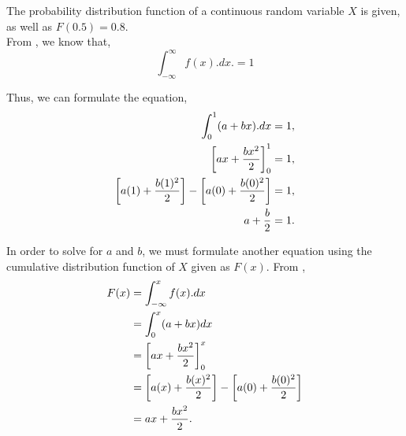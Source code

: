 %
%

\begin{subquestions}
	
\subquestion

\begin{subsubquestions}
	
\subsubquestion
The probability distribution function of a continuous random variable $X$ is given, as well as $F(0.5)=0.8.$ \\

From , we know that,
\begin{equation}
	 \int_{-\infty}^{\infty} f(x).dx. = 1
\end{equation}


Thus, we can formulate the equation,
\begin{align}
	\int_{0}^{1} (a+bx).dx = 1, \nonumber \\
	\left[ax + \frac{bx^2}{2}\right]_0^1 = 1, \nonumber \\
	\left[a(1) + \frac{b(1)^2}{2}\right] - \left[a(0) + \frac{b(0)^2}{2}\right]= 1, \nonumber \\
	a + \frac{b}{2} = 1. \label{2015:q4:eqn:crv1}
\end{align}

In order to solve for $a$ and $b$, we must formulate another equation using the cumulative distribution function of $X$ given as $F(x)$. From , 
\begin{align}
	F(x) & = \int_{-\infty}^{x} f(x).dx \nonumber \\
	     & = \int_{0}^{x} (a+bx)dx \nonumber \\
	     & = \left[ax + \frac{bx^2}{2}\right]_0^x \nonumber \\
	     & = \left[a(x) + \frac{b(x)^2}{2}\right] - \left[a(0) + \frac{b(0)^2}{2}\right] \nonumber \\
	     & = ax + \frac{bx^2}{2}.
\end{align}


\end{subsubquestions}
\end{subquestions}
